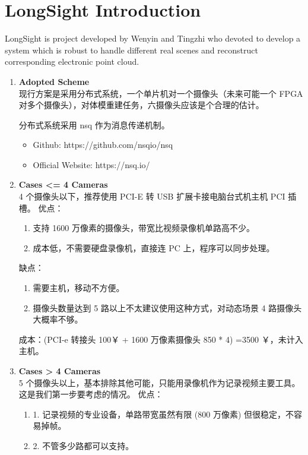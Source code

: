 \section{LongSight Introduction}


LongSight is project developed by Wenyin and Tingzhi who devoted to develop a system which is robust to handle different real scenes and reconstruct corresponding electronic point cloud.


\begin{enumerate}
    \item \textbf{Adopted Scheme}\\
    现行方案是采用分布式系统，一个单片机对一个摄像头（未来可能一个 FPGA 对多个摄像头），对体模重建任务，六摄像头应该是个合理的估计。

    分布式系统采用 nsq 作为消息传递机制。
    \begin{itemize}
        \item Github: https://github.com/nsqio/nsq
        \item Official Website: https://nsq.io/
    \end{itemize}



    \item \textbf{Cases <= 4 Cameras}\\
    4 个摄像头以下，推荐使用 PCI-E 转 USB 扩展卡接电脑台式机主机 PCI 插槽。
    优点：
    \begin{enumerate}
        \item  支持 1600 万像素的摄像头，带宽比视频录像机单路高不少。
        \item  成本低，不需要硬盘录像机，直接连 PC 上，程序可以同步处理。
    \end{enumerate}

    缺点：
    \begin{enumerate}
        \item 需要主机，移动不方便。
        \item 摄像头数量达到 5 路以上不太建议使用这种方式，对动态场景 4 路摄像头大概率不够。
    \end{enumerate}

    成本：(PCI-e 转接头 100￥ + 1600 万像素摄像头 850 * 4) =3500 ￥，未计入主机。

    \item \textbf{Cases > 4 Cameras}\\
    5 个摄像头以上，基本排除其他可能，只能用录像机作为记录视频主要工具。这是我们第一步要考虑的情况。
    优点：
    \begin{enumerate}
        \item 1. 记录视频的专业设备，单路带宽虽然有限 (800 万像素) 但很稳定，不容易掉帧。
        \item 2. 不管多少路都可以支持。
    \end{enumerate}


\end{enumerate}
